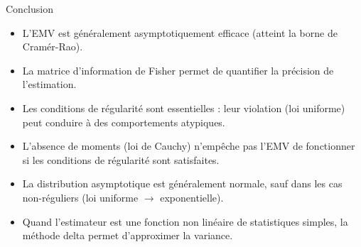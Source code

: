 \documentclass[11pt,aspectratio=169]{beamer}
\begin{document}
\begin{frame}{Conclusion}

\begin{itemize}

\item L'EMV est généralement asymptotiquement efficace (atteint la borne de Cramér-Rao).\newline

\item La matrice d'information de Fisher permet de quantifier la précision de l'estimation.\newline

\item Les conditions de régularité sont essentielles : leur violation (loi uniforme) peut conduire à des comportements atypiques.\newline

\item L'absence de moments (loi de Cauchy) n'empêche pas l'EMV de fonctionner si les conditions de régularité sont satisfaites.\newline

\item La distribution asymptotique est généralement normale, sauf dans les cas non-réguliers (loi uniforme $\to$ exponentielle).\newline

\item Quand l'estimateur est une fonction non linéaire de statistiques simples, la méthode delta permet d'approximer la variance.

\end{itemize}

\end{frame}
\end{document}
